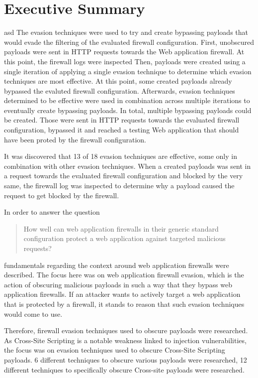 \section{Executive Summary}
asd
The evasion techniques were used to try and create bypassing payloads that would evade the filtering of the evaluated firewall configuration. 
First, unobscured payloads were sent in HTTP requests towards the Web application firewall.
At this point, the firewall logs were inspected
Then, payloads were created using a single iteration of applying a single evasion technique to determine which evasion techniques are most effective. At this point, some created payloads already bypassed the evaluted firewall configuration.
Afterwards, evasion techniques determined to be effective were used in combination across multiple iterations to eventually create bypassing payloads.
In total, multiple bypassing payloads could be created. Those were sent in HTTP requests towards the evaluated firewall configuration, bypassed it and reached a testing Web application that should have been proted by the firewall configuration.

It was discovered that 13 of 18 evasion techniques are effective, some only in combination with other evasion techniques. 
When a created payloads was sent in a request towards the evaluated firewall configuration and blocked by the very same, the firewall log was inspected to determine why a payload caused the request to get blocked by the firewall. 

In order to answer the question
\begin{quote}
	How well can web application firewalls in their generic standard configuration
	protect a web application against targeted malicious requests?
\end{quote}
fundamentals regarding the context around web application firewalls were described.
The focus here was on web application firewall evasion, which is the action of obscuring malicious payloads in such a way that they bypass web application firewalls.
If an attacker wants to actively target a web application that is protected by a firewall, it stands to reason that such evasion techniques would come to use. 

Therefore, firewall evasion techniques used to obscure payloads were researched.
As Cross-Site Scripting is a notable weakness linked to injection vulnerabilities, the focus was on evasion techniques used to obscure Cross-Site Scripting payloads.
6 different techniques to obscure various payloads were researched, 12 different techniques to specifically obscure Cross-site payloads were researched. 

